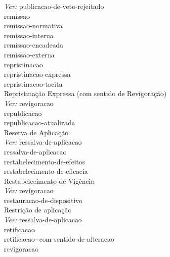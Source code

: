  \hspace*{1.0cm}\glosshsep \textit{Ver:} \Gls{publicacao-de-veto-rejeitado} \\ 
\Gls{remissao} \\ 
 \hspace*{1.0cm}\glosshsep \Gls{remissao-normativa} \\ 
 \hspace*{2.0cm}\glosshsep \Gls{remissao-interna} \\ 
 \hspace*{2.0cm}\glosshsep \Gls{remissao-encadeada} \\ 
 \hspace*{2.0cm}\glosshsep \Gls{remissao-externa} \\ 
\Gls{repristinacao} \\ 
 \hspace*{1.0cm}\glosshsep \Gls{repristinacao-expressa} \\ 
 \hspace*{1.0cm}\glosshsep \Gls{repristinacao-tacita} \\ 
Repristinação Expressa (com sentido de Revigoração) \\ 
 \hspace*{1.0cm}\glosshsep \textit{Ver:} \Gls{revigoracao} \\ 
\Gls{republicacao} \\ 
\Gls{republicacao-atualizada} \\ 
Reserva de Aplicação \\ 
 \hspace*{1.0cm}\glosshsep \textit{Ver:} \Gls{ressalva-de-aplicacao} \\ 
\Gls{ressalva-de-aplicacao} \\ 
\Gls{restabelecimento-de-efeitos} \\ 
\Gls{restabelecimento-de-eficacia} \\ 
Restabelecimento de Vigência \\ 
 \hspace*{1.0cm}\glosshsep \textit{Ver:} \Gls{revigoracao} \\ 
\Gls{restauracao-de-dispositivo} \\ 
Restrição de aplicação \\ 
 \hspace*{1.0cm}\glosshsep \textit{Ver:} \Gls{ressalva-de-aplicacao} \\ 
\Gls{retificacao} \\ 
\Gls{retificacao--com-sentido-de-alteracao} \\ 
\Gls{revigoracao} \\ 
